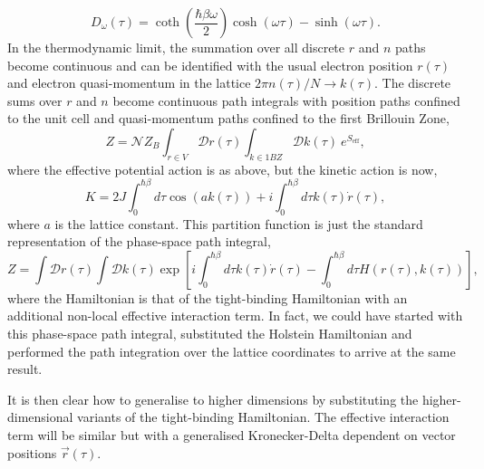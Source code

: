 \begin{equation} \label{eqn:phonongf}
    D_{\omega}(\tau) = \coth(\frac{\hbar\beta\omega}{2}) \cosh(\omega \tau) - \sinh(\omega\tau).
\end{equation}
In the thermodynamic limit, the summation over all discrete $r$ and $n$ paths become continuous and can be identified with the usual electron position $r(\tau)$ and electron quasi-momentum in the lattice $ 
2\pi n(\tau) / N \rightarrow k(\tau)$. The discrete sums over $r$ and $n$ become continuous path integrals with position paths confined to the unit cell and quasi-momentum paths confined to the first Brillouin Zone,
\begin{equation}
    Z = \mathcal{N} Z_B \int_{r \in V} \mathcal{D}r(\tau) \int_{k \in 1BZ} \mathcal{D} k(\tau)\ e^{S_{\text{eff}}} ,
\end{equation}
where the effective potential action is as above, but the kinetic action is now,
\begin{equation}
    K = 2 J \int_0^{\hbar\beta} d\tau \cos{(a k(\tau))} + i \int_0^{\hbar\beta} d\tau k(\tau) \Dot{r}(\tau) ,
\end{equation}
where $a$ is the lattice constant. This partition function is just the standard representation of the phase-space path integral,
\begin{equation}
    Z = \int \mathcal{D}r(\tau) \int \mathcal{D}k(\tau) \exp \left[i \int_0^{\hbar\beta} d\tau k(\tau) \Dot{r}(\tau) - \int_0^{\hbar\beta} d\tau H(r(\tau), k(\tau)) \right] ,
\end{equation}
where the Hamiltonian is that of the tight-binding Hamiltonian with an additional non-local effective interaction term. In fact, we could have started with this phase-space path integral, substituted the Holstein Hamiltonian and performed the path integration over the lattice coordinates to arrive at the same result. 
\newline

It is then clear how to generalise to higher dimensions by substituting the higher-dimensional variants of the tight-binding Hamiltonian. The effective interaction term will be similar but with a generalised Kronecker-Delta dependent on vector positions $\Vec{r}(\tau)$.
\newline


